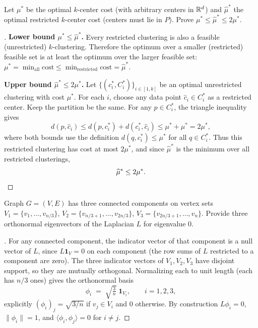 \documentclass[en,hazy,blue,12pt,normal]{../../elegantnote}
\begin{document}
\begin{homework}
Let $\mu^*$ be the optimal $k$-center cost (with arbitrary centers in $\mathbb R^d$) and $\widehat\mu^*$ the optimal restricted $k$-center cost (centers must lie in $P$). Prove $\mu^*\le \widehat\mu^*\le 2\mu^*$.
\end{homework}

\begin{proof}[\solutionname]

\textbf{Lower bound $\mu^*\le \widehat\mu^*$.}
Every restricted clustering is also a feasible (unrestricted) $k$-clustering. Therefore the optimum over a smaller (restricted) feasible set is at least the optimum over the larger feasible set:
$\mu^*=\min_{\text{all}}\text{cost}\le \min_{\text{restricted}}\text{cost}=\widehat\mu^*.$

\textbf{Upper bound $\widehat\mu^*\le 2\mu^*$.}
Let $\{(c_i^*,C_i^*)\}_{i\in[1,k]}$ be an optimal unrestricted clustering with cost $\mu^*$. For each $i$, choose any data point $\widehat c_i\in C_i^*$ as a restricted center. Keep the partition be the same. For any $p\in C_i^*$, the triangle inequality gives
\[
d(p,\widehat c_i)\le d(p,c_i^*)+d(c_i^*,\widehat c_i)\le \mu^*+\mu^*=2\mu^*,
\]
where both bounds use the definition $d(q,c_i^*)\le \mu^*$ for all $q\in C_i^*$. Thus this restricted clustering has cost at most $2\mu^*$, and since $\widehat\mu^*$ is the minimum over all restricted clusterings,
\[
\widehat\mu^*\le 2\mu^*.\qedhere
\]
\end{proof}

\begin{homework}
Graph $G=(V,E)$ has three connected components on vertex sets $V_1=\{v_1,\dots,v_{n/3}\}$, $V_2=\{v_{n/3+1},\dots,v_{2n/3}\}$, $V_3=\{v_{2n/3+1},\dots,v_n\}$. Provide three orthonormal eigenvectors of the Laplacian $L$ for eigenvalue $0$.
\end{homework}

\begin{proof}[\solutionname]
For any connected component, the indicator vector of that component is a null vector of $L$, since $L\bm 1_V=0$ on each component (the row sums of $L$ restricted to a component are zero). The three indicator vectors of $V_1,V_2,V_3$ have disjoint support, so they are mutually orthogonal. Normalizing each to unit length (each has $n/3$ ones) gives the orthonormal basis
\[
\phi_i \;=\; \sqrt{\tfrac{3}{n}}\;\bm 1_{V_i},\qquad i=1,2,3,
\]
explicitly $(\phi_i)_j=\sqrt{3/n}$ if $v_j\in V_i$ and $0$ otherwise. By construction $L\phi_i=0$, $\|\phi_i\|=1$, and $\langle\phi_i,\phi_j\rangle=0$ for $i\ne j$.
\end{proof}
\end{document}

